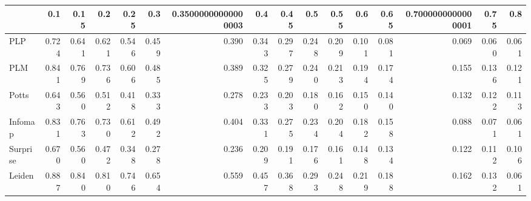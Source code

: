 \begin{tabular}{lrrrrrrrrrrrrrrr}
\toprule
{} &   0.1 &  0.15 &   0.2 &  0.25 &   0.3 & 0.35000000000000003 &   0.4 &  0.45 &   0.5 &  0.55 &   0.6 &  0.65 & 0.7000000000000001 &  0.75 &   0.8 \\
\midrule
PLP      & 0.724 & 0.641 & 0.621 & 0.546 & 0.459 &               0.390 & 0.343 & 0.297 & 0.248 & 0.209 & 0.101 & 0.081 &              0.069 & 0.060 & 0.061 \\
PLM      & 0.841 & 0.769 & 0.736 & 0.606 & 0.485 &               0.389 & 0.325 & 0.279 & 0.240 & 0.213 & 0.194 & 0.174 &              0.155 & 0.136 & 0.121 \\
Potts    & 0.643 & 0.560 & 0.512 & 0.418 & 0.333 &               0.278 & 0.233 & 0.203 & 0.180 & 0.162 & 0.150 & 0.140 &              0.132 & 0.122 & 0.113 \\
Infomap  & 0.831 & 0.763 & 0.730 & 0.612 & 0.492 &               0.404 & 0.331 & 0.275 & 0.234 & 0.204 & 0.182 & 0.158 &              0.088 & 0.071 & 0.061 \\
Surprise & 0.670 & 0.560 & 0.472 & 0.348 & 0.278 &               0.236 & 0.209 & 0.191 & 0.176 & 0.161 & 0.148 & 0.134 &              0.122 & 0.112 & 0.106 \\
Leiden   & 0.887 & 0.840 & 0.810 & 0.746 & 0.654 &               0.559 & 0.457 & 0.368 & 0.293 & 0.248 & 0.219 & 0.188 &              0.162 & 0.132 & 0.061 \\
\bottomrule
\end{tabular}
